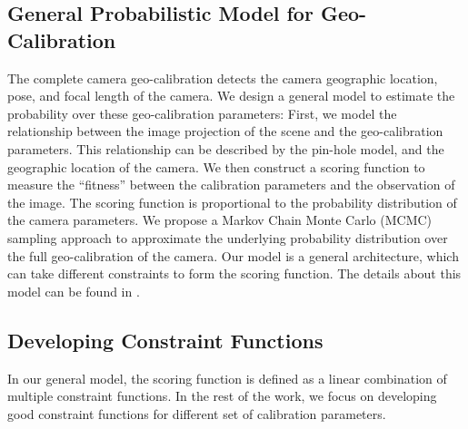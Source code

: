 \subsection{General Probabilistic Model for Geo-Calibration}
The complete camera geo-calibration detects the camera
geographic location, pose, and focal length of the camera.  We
design a general model to estimate the probability over these
geo-calibration parameters: First, we model the relationship between the
image projection of the scene and the geo-calibration parameters. This
relationship can be described by the pin-hole model, and
the geographic location of the camera.
We then construct a scoring function to measure the ``fitness'' between the
calibration parameters and the observation of the image. 
The scoring function is proportional to the probability distribution
of the camera parameters. We propose a Markov Chain Monte
Carlo (MCMC) sampling approach to approximate the underlying
probability distribution over the full geo-calibration of the camera.
Our model is a general architecture, which can take different
constraints to form the scoring function. The details about this model
can be found in .

\subsection{Developing Constraint Functions}
In our general model, the scoring function is defined as a linear
combination of multiple constraint functions.
In the rest of the work, we focus on developing good constraint
functions for different set of calibration parameters. 

